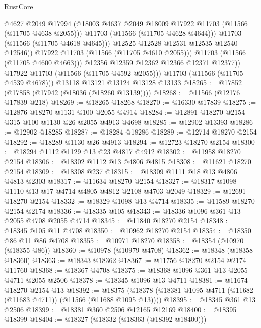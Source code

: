\begin{lexlean}{RustCore}
\begin{coremodule}
                        @4627
                        @2049
                        @17994
                        (@18003 @4637 @2049 @18009 @17922 @11703 (@11566 (@11705 @4638 @2055)))
                        @11703
                        (@11566 (@11705 @4628 @4644)))
                      @11703
                      (@11566 (@11705 @4618 @4645)))
                    @12525
                    @12528
                    @12531
                    @12535
                    @12540
                    @12546))
                @17922
                @11703
                (@11566 (@11705 @4610 @2055)))
              @11703
              (@11566 (@11705 @4600 @4663)))
            @12356
            @12359
            @12362
            @12366
            @12371
            @12377))
        @17922
        @11703
        (@11566 (@11705 @4592 @2055)))
      @11703
      (@11566 (@11705 @4539 @4678)))
    @13118
    @13121
    @13124
    @13128
    @13133
@18265 := @17852 (@17858 (@17942 (@18036 (@18260 @13139))))
@18268 := @11566 (@12176 @17839 @218)
@18269 := @18265 @18268
@18270 := @16330 @17839
@18275 := @12876 @18270 @1131 @100 @2055 @4914
@18284 := @12891 @18270 @2154 @315 @100 @1130 @26 @2055 @4913 @4698
@18285 := @12902 @13393
@18286 := @12902 @18285
@18287 := @18284 @18286
@18289 := @12714 @18270 @2154
@18292 := @18289 @1130 @26 @4913
@18294 := @12723 @18270 @2154
@18300 := @18294 @1112 @1129 @13 @23 @4817 @4912
@18302 := @11958 @18270 @2154
@18306 := @18302 @1112 @13 @4806 @4815
@18308 := @11621 @18270 @2154
@18309 := @18308 @237
@18315 := @18309 @1111 @18 @13 @4806 @4813 @2303
@18317 := @11634 @18270 @2154
@18327 := @18317 @1098 @1110 @13 @17 @4714 @4805 @4812 @2108 @4703 @2049
@18329 := @12691 @18270 @2154
@18332 := @18329 @1098 @13 @4714
@18335 := @11589 @18270 @2154 @2174
@18336 := @18335 @105
@18343 := @18336 @1096 @361 @13 @2055 @4708 @2055 @4714
@18345 := @11840 @18270 @2154
@18348 := @18345 @105 @11 @4708
@18350 := @10962 @18270 @2154
@18354 := @18350 @86 @11 @86 @4708
@18355 := @10971 @18270
@18358 := @18354 (@10970 (@18355 @86))
@18360 := @10978 (@10979 @4708)
@18362 := @18348 (@18358 @18360)
@18363 := @18343 @18362
@18367 := @11756 @18270 @2154 @2174 @11760
@18368 := @18367 @4708
@18375 := @18368 @1096 @361 @13 @2055 @4711 @2055 @2506
@18378 := @18345 @1096 @13 @4711
@18381 := @11674 @18270 @2154 @13
@18392 := @18375 (@18378 (@18381 @1095 @4711 (@11682 (@11683 @4711)) (@11566 (@11688 @1095 @13))))
@18395 := @18345 @361 @13 @2506
@18399 := @18381 @360 @2506 @12165 @12169
@18400 := @18395 @18399
@18404 := @18327 (@18332 (@18363 (@18392 @18400)))

\end{coremodule}
\end{lexlean}
